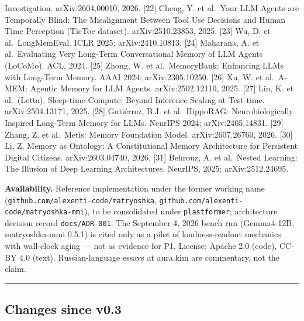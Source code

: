 \documentclass[
]{article}
\begin{document}
Investigation. arXiv:2604.00010, 2026. {[}22{]} Cheng, Y. et al.~Your
LLM Agents are Temporally Blind: The Misalignment Between Tool Use
Decisions and Human Time Perception (TicToc dataset). arXiv:2510.23853,
2025. {[}23{]} Wu, D. et al.~LongMemEval. ICLR 2025; arXiv:2410.10813.
{[}24{]} Maharana, A. et al.~Evaluating Very Long-Term Conversational
Memory of LLM Agents (LoCoMo). ACL, 2024. {[}25{]} Zhong, W. et
al.~MemoryBank: Enhancing LLMs with Long-Term Memory. AAAI 2024;
arXiv:2305.10250. {[}26{]} Xu, W. et al.~A-MEM: Agentic Memory for LLM
Agents. arXiv:2502.12110, 2025. {[}27{]} Lin, K. et al.~(Letta).
Sleep-time Compute: Beyond Inference Scaling at Test-time.
arXiv:2504.13171, 2025. {[}28{]} Gutiérrez, B.J. et al.~HippoRAG:
Neurobiologically Inspired Long-Term Memory for LLMs. NeurIPS 2024;
arXiv:2405.14831. {[}29{]} Zhang, Z. et al.~Metis: Memory Foundation
Model. arXiv:2607.26760, 2026. {[}30{]} Li, Z. Memory as Ontology: A
Constitutional Memory Architecture for Persistent Digital Citizens.
arXiv:2603.04740, 2026. {[}31{]} Behrouz, A. et al.~Nested Learning: The
Illusion of Deep Learning Architectures. NeurIPS, 2025;
arXiv:2512.24695.

\textbf{Availability.} Reference implementation under the former working
name (\texttt{github.com/alexenti-code/matryoshka},
\texttt{github.com/alexenti-code/matryoshka-mmi}), to be consolidated
under \texttt{plastformer}; architecture decision record
\texttt{docs/ADR-001}. The September 4, 2026 bench run (Gemma4-12B,
matryoshka-mmi 0.5.1) is cited only as a pilot of loudness-readout
mechanics with wall-clock aging --- not as evidence for P1. License:
Apache 2.0 (code), CC-BY 4.0 (text). Russian-language essays at aura.kim
are commentary, not the claim.

\begin{center}\rule{0.5\linewidth}{0.5pt}\end{center}

\subsection{Changes since v0.3}\label{changes-since-v0.3}
\end{document}
